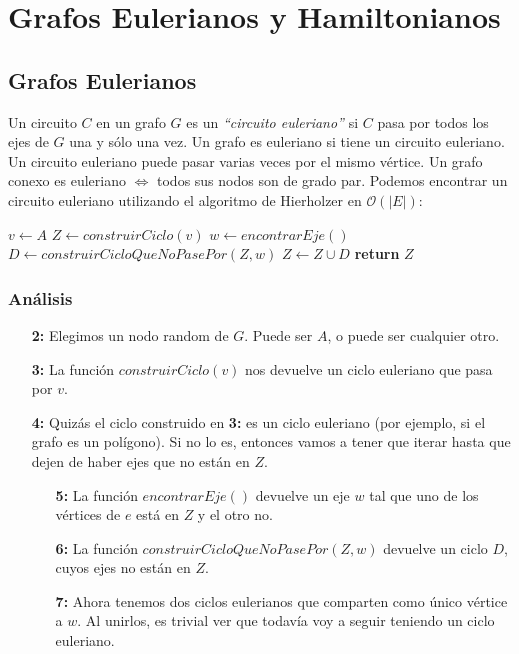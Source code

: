 \newpage
\section{Grafos Eulerianos y Hamiltonianos}

\subsection{Grafos Eulerianos}

Un circuito $C$ en un grafo $G$ es un \emph{``circuito euleriano''} si $C$ pasa por todos los ejes de $G$ una y s\'olo una vez. Un grafo es euleriano si tiene un circuito euleriano. Un circuito euleriano puede pasar varias veces por el mismo v\'ertice. Un grafo conexo es euleriano $\Leftrightarrow$ todos sus nodos son de grado par. Podemos encontrar un circuito euleriano utilizando el algoritmo de Hierholzer en $\mathcal{O}(|E|)$: 

\begin{algorithm}
\begin{algorithmic}[1]
  \State $v \gets A$
  \State $Z \gets construirCiclo(v)$
    \State $w \gets encontrarEje()$
    \State $D \gets construirCicloQueNoPasePor(Z, w)$
    \State $Z \gets Z \cup D$
  \EndWhile
  \State \textbf{return} $Z$
\EndFunction
\end{algorithmic}
\end{algorithm}

\subsubsection*{An\'alisis}

\begin{enumerate}
  \item [\textbf{2:}] Elegimos un nodo random de $G$. Puede ser $A$, o puede ser cualquier otro.
  \item [\textbf{3:}] La funci\'on $construirCiclo(v)$ nos devuelve un ciclo euleriano que pasa por $v$.
  \item [\textbf{4:}] Quiz\'as el ciclo construido en \textbf{3:} es un ciclo euleriano (por ejemplo, si el grafo es un pol\'igono). Si no lo es, entonces vamos a tener que iterar hasta que dejen de haber ejes que no est\'an en $Z$.
  \begin{enumerate}
    \item [\textbf{5:}] La funci\'on $encontrarEje()$ devuelve un eje $w$ tal que uno de los v\'ertices de $e$ est\'a en $Z$ y el otro no.
    \item [\textbf{6:}] La funci\'on $construirCicloQueNoPasePor(Z, w)$ devuelve un ciclo $D$, cuyos ejes no est\'an en $Z$.
    \item [\textbf{7:}] Ahora tenemos dos ciclos eulerianos que comparten como \'unico v\'ertice a $w$. Al unirlos, es trivial ver que todav\'ia voy a seguir teniendo un ciclo euleriano.
  \end{enumerate}
\end{enumerate}

